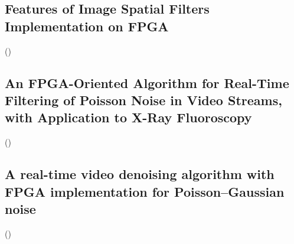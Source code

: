 \subsection{Features of Image Spatial Filters Implementation on FPGA}
\blindtext (\cite{soa:dmitry})

\subsection{An FPGA-Oriented Algorithm for Real-Time Filtering of Poisson Noise in Video Streams, with Application to X-Ray Fluoroscopy}
\blindtext (\cite{soa:castellano})

\subsection{A real-time video denoising algorithm with FPGA implementation for Poisson–Gaussian noise}
\blindtext (\cite{soa:xin})